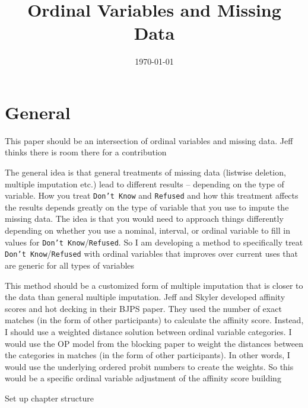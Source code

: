 \documentclass[12pt]{article}
\title{Ordinal Variables and Missing Data}
\date{\today}
\begin{document}
\maketitle

\section*{General}
	\begin{coi}
		\item This paper should be an intersection of ordinal variables and missing data. Jeff thinks there is room there for a contribution
		\item The general idea is that general treatments of missing data (listwise deletion, multiple imputation etc.) lead to different results -- depending on the type of variable. How you treat \texttt{Don't Know} and \texttt{Refused} and how this treatment affects the results depends greatly on the type of variable that you use to impute the missing data. The idea is that you would need to approach things differently depending on whether you use a nominal, interval, or ordinal variable to fill in values for \texttt{Don't Know}/\texttt{Refused}. So I am developing a method to specifically treat \texttt{Don't Know}/\texttt{Refused} with ordinal variables that improves over current uses that are generic for all types of variables
		\item This method should be a customized form of multiple imputation that is closer to the data than general multiple imputation. Jeff and Skyler developed affinity scores and hot decking in their BJPS paper. They used the number of exact matches (in the form of other participants) to calculate the affinity score. Instead, I should use a weighted distance solution between ordinal variable categories. I would use the OP model from the blocking paper to weight the distances between the categories in matches (in the form of other participants). In other words, I would use the underlying ordered probit numbers to create the weights. So this would be a specific ordinal variable adjustment of the affinity score building
		\item Set up chapter structure
	\end{coi}
\end{document}
